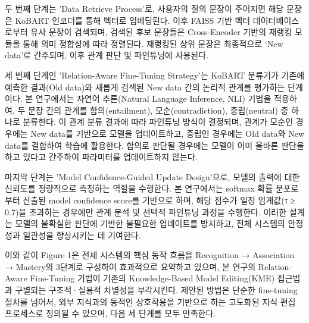 \documentclass[a4paper,fleqn]{cas-sc}
\begin{document}
두 번째 단계는 'Data Retrieve Process'로, 사용자의 질의 문장이 주어지면 해당 문장은 KoBART 인코더를 통해 벡터로 임베딩된다. 이후 FAISS 기반 벡터 데이터베이스로부터 유사 문장이 검색되며, 검색된 후보 문장들은 Cross-Encoder 기반의 재랭킹 모듈을 통해 의미 정합성에 따라 정렬된다. 재랭킹된 상위 문장은 최종적으로 ‘New data’로 간주되며, 이후 관계 판단 및 파인튜닝에 사용된다.

세 번째 단계인 'Relation-Aware Fine-Tuning Strategy'는 KoBART 분류기가 기존에 예측한 결과(Old data)와 새롭게 검색된 New data 간의 논리적 관계를 평가하는 단계이다. 본 연구에서는 자연어 추론(Natural Language Inference, NLI) 기법을 적용하여, 두 문장 간의 관계를 함의(entailment), 모순(contradiction), 중립(neutral) 중 하나로 분류한다. 이 관계 분류 결과에 따라 파인튜닝 방식이 결정되며, 관계가 모순인 경우에는 New data를 기반으로 모델을 업데이트하고, 중립인 경우에는 Old data와 New data를 결합하여 학습에 활용한다. 함의로 판단될 경우에는 모델이 이미 올바른 판단을 하고 있다고 간주하여 파라미터를 업데이트하지 않는다.

마지막 단계는 'Model Confidence-Guided Update Design'으로, 모델의 출력에 대한 신뢰도를 정량적으로 측정하는 역할을 수행한다. 본 연구에서는 softmax 확률 분포로부터 산출된 model confidence score를 기반으로 하며, 해당 점수가 일정 임계값(τ ≥ 0.7)을 초과하는 경우에만 관계 분석 및 선택적 파인튜닝 과정을 수행한다. 이러한 설계는 모델의 불확실한 판단에 기반한 불필요한 업데이트를 방지하고, 전체 시스템의 안정성과 일관성을 향상시키는 데 기여한다.

이와 같이 Figure 1은 전체 시스템의 핵심 동작 흐름을 Recognition → Association → Mastery의 3단계로 구성하여 효과적으로 요약하고 있으며, 본 연구의 Relation-Aware Fine-Tuning 기법이 기존의 Knowledge-Based Model Editing(KME) 접근법과 구별되는 구조적·실용적 차별성을 부각시킨다. 제안된 방법은 단순한 fine-tuning 절차를 넘어서, 외부 지식과의 동적인 상호작용을 기반으로 하는 고도화된 지식 편집 프로세스로 정의될 수 있으며, 다음 세 단계를 모두 만족한다.
\end{document}
